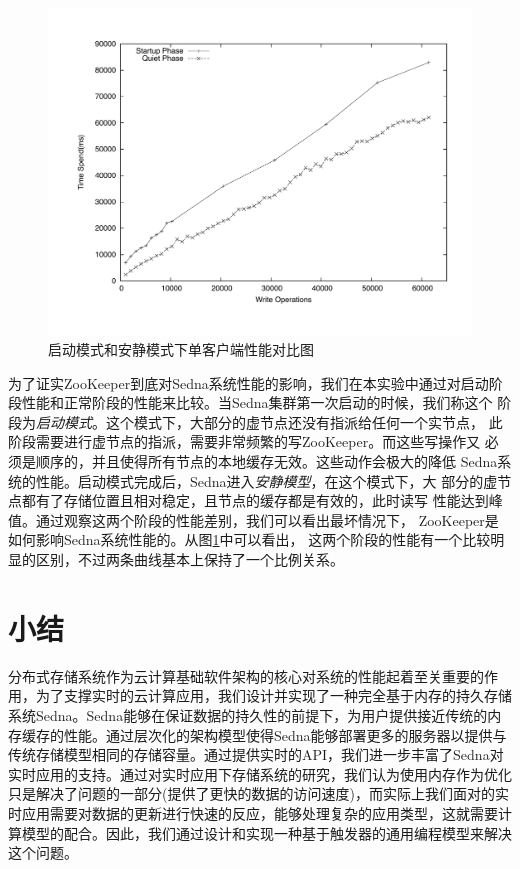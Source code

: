 \begin{figure}[h!]
  \centering
  \includegraphics[width=4.5in]{../figures/sedna_write_quiet_startup_compare_one_client.pdf}
  \caption{启动模式和安静模式下单客户端性能对比图}
  \label{fig:zkquiet}
\end{figure}


为了证实ZooKeeper到底对Sedna系统性能的影响，我们在本实验中通过对启动阶
段性能和正常阶段的性能来比较。当Sedna集群第一次启动的时候，我们称这个
阶段为\textit{启动模式}。这个模式下，大部分的虚节点还没有指派给任何一个实节点，
此阶段需要进行虚节点的指派，需要非常频繁的写ZooKeeper。而这些写操作又
必须是顺序的，并且使得所有节点的本地缓存无效。这些动作会极大的降低
Sedna系统的性能。启动模式完成后，Sedna进入\textit{安静模型}，在这个模式下，大
部分的虚节点都有了存储位置且相对稳定，且节点的缓存都是有效的，此时读写
性能达到峰值。通过观察这两个阶段的性能差别，我们可以看出最坏情况下，
ZooKeeper是如何影响Sedna系统性能的。从图\ref{fig:zkquiet}中可以看出，
这两个阶段的性能有一个比较明显的区别，不过两条曲线基本上保持了一个比例关系。

\section{小结}
\label{section:con3}
分布式存储系统作为云计算基础软件架构的核心对系统的性能起着至关重要的作用，为了支撑实时的云计算应用，我们设计并实现了一种完全基于内存的持久存储系统Sedna。Sedna能够在保证数据的持久性的前提下，为用户提供接近传统的内存缓存的性能。通过层次化的架构模型使得Sedna能够部署更多的服务器以提供与传统存储模型相同的存储容量。通过提供实时的API，我们进一步丰富了Sedna对实时应用的支持。通过对实时应用下存储系统的研究，我们认为使用内存作为优化只是解决了问题的一部分(提供了更快的数据的访问速度)，而实际上我们面对的实时应用需要对数据的更新进行快速的反应，能够处理复杂的应用类型，这就需要计算模型的配合。因此，我们通过设计和实现一种基于触发器的通用编程模型来解决这个问题。

